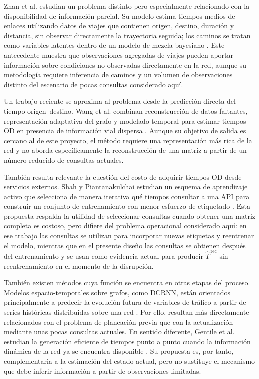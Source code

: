 \documentclass[11pt]{article}
\begin{document}
Zhan et al. estudian un problema distinto pero especialmente relacionado con
la disponibilidad de información parcial. Su modelo estima tiempos medios de
enlaces utilizando datos de viajes que contienen origen, destino, duración y
distancia, sin observar directamente la trayectoria seguida; los caminos se
tratan como variables latentes dentro de un modelo de mezcla bayesiano
\citep{zhan2016bayesian}. Este antecedente muestra que observaciones
agregadas de viajes pueden aportar información sobre condiciones no observadas
directamente en la red, aunque su metodología requiere inferencia de caminos y
un volumen de observaciones distinto del escenario de pocas consultas
considerado aquí.

Un trabajo reciente se aproxima al problema desde la predicción directa del
tiempo origen--destino. Wang et al. combinan reconstrucción de datos faltantes,
representación adaptativa del grafo y modelado temporal para estimar tiempos OD
en presencia de información vial dispersa \citep{wang2025od}. Aunque su
objetivo de salida es cercano al de este proyecto, el método requiere una
representación más rica de la red y no aborda específicamente la reconstrucción
de una matriz a partir de un número reducido de consultas actuales.

También resulta relevante la cuestión del costo de adquirir tiempos OD desde
servicios externos. Shah y Piantanakulchai estudian un esquema de aprendizaje
activo que selecciona de manera iterativa qué tiempos consultar a una API para
construir un conjunto de entrenamiento con menor esfuerzo de etiquetado
\citep{shah2026active}. Esta propuesta respalda la utilidad de seleccionar
consultas cuando obtener una matriz completa es costoso, pero difiere del
problema operacional considerado aquí: en ese trabajo las consultas se utilizan
para incorporar nuevas etiquetas y reentrenar el modelo, mientras que en el
presente diseño las consultas se obtienen después del entrenamiento y se usan
como evidencia actual para producir \(
\widehat{T}^{\,\mathrm{rec}}
\) sin reentrenamiento en el momento de la disrupción.

También existen métodos cuya función se encuentra en otras etapas del proceso.
Modelos espacio-temporales sobre grafos, como DCRNN, están orientados
principalmente a predecir la evolución futura de variables de tráfico a partir
de series históricas distribuidas sobre una red
\citep{li2018dcrnn}. Por ello, resultan más directamente relacionados con
el problema de planeación previa que con la actualización mediante unas pocas
consultas actuales. En sentido diferente, Gentile et al. estudian la
generación eficiente de tiempos punto a punto cuando la información dinámica
de la red ya se encuentra disponible \citep{gentile2020fast}. Su propuesta
es, por tanto, complementaria a la estimación del estado actual, pero no
sustituye el mecanismo que debe inferir información a partir de observaciones
limitadas.
\end{document}
